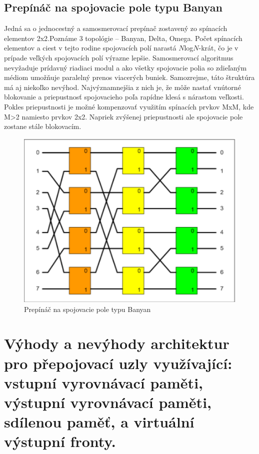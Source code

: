 \newpage
\subsection{Prepínáč na spojovacie pole typu Banyan}
Jedná sa o jednocestný a samosmerovací prepínač zostavený zo spínacích elementov 2x2.Poznáme 3 topológie -- Banyan, Delta, Omega.\newline
Počet spínacích elementov a ciest v tejto rodine spojovacích polí narastá $N$log$N$-krát, čo je v prípade veľkých spojovacích polí výrazne lepšie. Samosmerovací algoritmus nevyžaduje prídavný riadiaci modul a ako všetky spojovacie polia so zdieľaným médiom umožňuje paralelný prenos viacerých buniek. Samozrejme, táto štruktúra má aj niekoľko nevýhod. Najvýznamnejšia z nich je, že môže nastať vnútorné blokovanie a priepustnosť spojovacieho poľa rapídne klesá s nárastom veľkosti. Pokles priepustnosti je možné kompenzovať využitím spínacích prvkov MxM, kde M>2 namiesto prvkov 2x2. Napriek zvýšenej priepustnosti ale spojovacie pole zostane stále blokovacím.

\begin{figure}[ht]
\centering
  \begin{center}
    \includegraphics[scale=0.8]{BPC-HWS/images/banyan.png}
  \end{center}
  \caption[Prepínáč na spojovacie pole typu Banyan]{Prepínáč na spojovacie pole typu Banyan}
\end{figure}

\newpage
\section{Výhody a nevýhody architektur pro přepojovací uzly využívající: vstupní vyrovnávací paměti, výstupní vyrovnávací paměti, sdílenou paměť, a virtuální výstupní fronty.}

